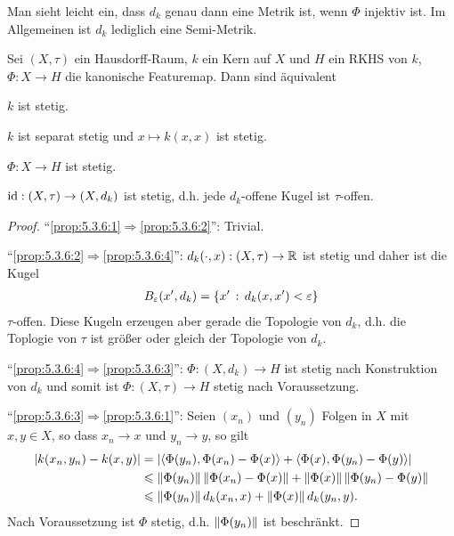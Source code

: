 Man sieht leicht ein, dass $d_k$ genau dann eine Metrik ist, wenn $\Phi$
injektiv ist.
Im Allgemeinen ist $d_k$ lediglich eine Semi-Metrik.

\begin{lem}
\label{prop:5.3.6}
Sei $(X,\tau)$ ein Hausdorff-Raum, $k$ ein Kern auf $X$ und $H$ ein RKHS von
$k$, $\Phi: X\to H$ die kanonische Featuremap. Dann sind äquivalent
\begin{equivenum}
\item\label{prop:5.3.6:1} $k$ ist stetig.
\item\label{prop:5.3.6:2} $k$ ist separat stetig und $x\mapsto k(x,x)$ ist
stetig.
\item\label{prop:5.3.6:3} $\Phi: X\to H$ ist stetig.
\item\label{prop:5.3.6:4} $\operatorname{id} : (X,\tau) \to (X,d_k)$ ist stetig, d.h. jede
$d_k$-offene Kugel ist $\tau$-offen.\fishhere
\end{equivenum}
\end{lem}

\begin{proof}
"`\ref{prop:5.3.6:1}$\Rightarrow$\ref{prop:5.3.6:2}"': Trivial.

"`\ref{prop:5.3.6:2}$\Rightarrow$\ref{prop:5.3.6:4}"': $d_k(\cdot,x):
(X,\tau)\to \mathbb{R}$ ist stetig und daher ist die Kugel
\begin{align*}
B_\varepsilon(x',d_k) = \left\{ x'\,:\,d_k(x,x') < \varepsilon\right\}
\end{align*}
$\tau$-offen. Diese Kugeln erzeugen aber gerade die Topologie von $d_k$, d.h.
die Toplogie von $\tau$ ist größer oder gleich der Topologie von $d_k$.

"`\ref{prop:5.3.6:4}$\Rightarrow$\ref{prop:5.3.6:3}"': $\Phi: (X,d_k)\to H$ ist
stetig nach Konstruktion von $d_k$ und somit ist $\Phi: (X,\tau)\to H$ stetig
nach Voraussetzung.

"`\ref{prop:5.3.6:3}$\Rightarrow$\ref{prop:5.3.6:1}"': Seien $(x_n)$ und
$(y_n)$ Folgen in $X$ mit $x,y\in X$, so dass $x_n\to x$ und $y_n\to y$, so gilt
\begin{align*}
\left|k(x_n,y_n)-k(x,y)\right| &= \left|\left\langle\Phi(y_n),\Phi(x_n)-\Phi(x)\right\rangle+
\left\langle\Phi(x),\Phi(y_n)-\Phi(y)\right\rangle\right|\\
&\leqslant \left\|\Phi(y_n)\right\|\left\|\Phi(x_n)-\Phi(x)\right\| +
\left\|\Phi(x)\right\|\left\|\Phi(y_n)-\Phi(y)\right\|\\
&\leqslant \left\|\Phi(y_n)\right\|d_k(x_n,x) + \left\|\Phi(x)\right\|d_k(y_n,y). 
\end{align*}
Nach Voraussetzung ist $\Phi$ stetig, d.h. $\left\|\Phi(y_n)\right\|$ ist beschränkt.\qedhere 
\end{proof}

